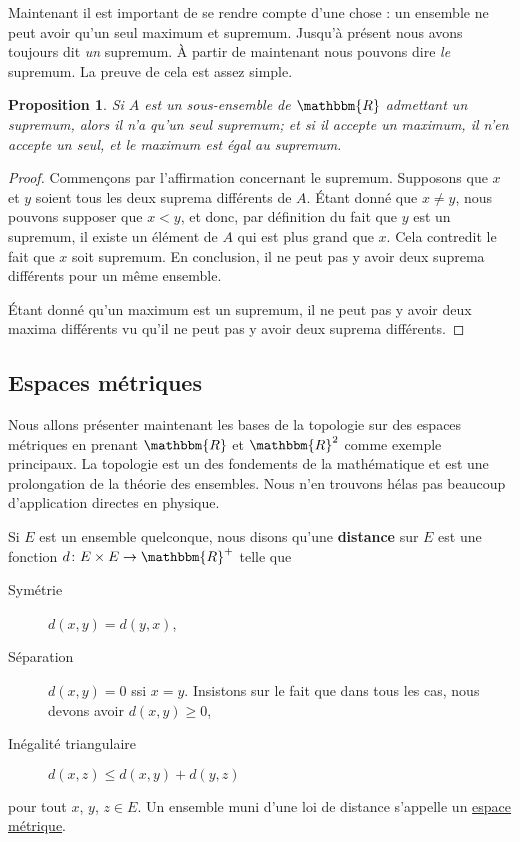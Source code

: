 \documentclass[a4paper,12pt]{book}
\newcommand{\eR}{\mathbbm{R}}
\newcounter{numtho}
\theoremstyle{mes_exemples}	\newtheorem{exemple}[numtho]{Exemple}
\theoremstyle{mes_tho}
\newtheorem{proposition}[numtho]{Proposition}
\newcommand{\defe}[2]{\textbf{#1}\index{#2}}
\begin{document}

Maintenant il est important de se rendre compte d'une chose : un ensemble ne peut avoir qu'un seul maximum et supremum. Jusqu'à présent nous avons toujours dit \emph{un} supremum. À partir de maintenant nous pouvons dire \emph{le} supremum. La preuve de cela est assez simple.
\begin{proposition}
Si $A$ est un sous-ensemble de $\eR$ admettant un supremum, alors il n'a qu'un seul supremum; et si il accepte un maximum, il n'en accepte un seul, et le maximum est égal au supremum.
\end{proposition}

\begin{proof}
Commençons par l'affirmation concernant le supremum. Supposons que $x$ et $y$ soient tous les deux suprema différents de $A$. Étant donné que $x\neq y$, nous pouvons supposer que $x<y$, et donc, par définition du fait que $y$ est un supremum, il existe un élément de $A$ qui est plus grand que $x$. Cela contredit le fait que $x$ soit supremum. En conclusion, il ne peut pas y avoir deux suprema différents pour un même ensemble.

Étant donné qu'un maximum est un supremum, il ne peut pas y avoir deux maxima différents vu qu'il ne peut pas y avoir deux suprema différents.
\end{proof}


\subsection{Espaces métriques}

Nous allons présenter maintenant les bases de la topologie sur des espaces métriques en prenant $\eR$ et $\eR^2$ comme exemple principaux. La topologie est un des fondements de la mathématique et est une prolongation de la théorie des ensembles. Nous n'en trouvons hélas pas beaucoup d'application directes en physique.

Si $E$ est un ensemble quelconque, nous disons qu'une \defe{distance}{Distance} sur $E$ est une fonction $d\colon E\times E\to \eR^+$ telle que
\begin{description}
\item[Symétrie] $d(x,y)=d(y,x)$,
\item[Séparation] $d(x,y)=0$ ssi $x=y$. Insistons sur le fait que dans tous les cas, nous devons avoir $d(x,y)\geq 0$,
\item[Inégalité triangulaire] $d(x,z)\leq d(x,y)+d(y,z)$
\end{description}
pour tout $x$, $y$, $z\in E$. Un ensemble muni d'une loi de distance s'appelle un \href{http://fr.wikipedia.org/wiki/Espace_métrique}{espace métrique}.
\end{document}
